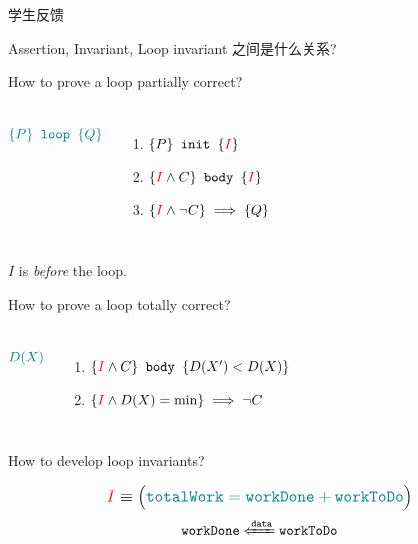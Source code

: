 
\begin{frame}{学生反馈}
  \centerline{\large {} Assertion, Invariant, Loop invariant 之间是什么关系?}
\end{frame}

\begin{frame}{}
  \centerline{\large {} How to prove a loop partially correct?}

  \begin{columns}
      \pause
      \[
	\textcolor{teal}{\{P\} \texttt{ loop } \{Q\}}
      \]
      \vspace{-0.20cm}
      \pause
      \begin{enumerate}[(1)]
	\setlength{\itemsep}{8pt}
	\item $\{P\} \texttt{ init } \{\textcolor{red}{I}\}$
	\item $\{\textcolor{red}{I} \land C\} \texttt{ body } \{\textcolor{red}{I}\}$
	\item $\{\textcolor{red}{I} \land \lnot C\} \implies \{Q\}$
      \end{enumerate}
  \end{columns}

  \pause
  \vspace{0.50cm}
  \centerline{$I$ is \emph{before} the loop.}
\end{frame}

\begin{frame}{}
  \centerline{\large {} How to prove a loop totally correct?}

  \begin{columns}
      \[
	\textcolor{teal}{D(X)}
      \]
      \vspace{-0.20cm}
      \pause
      \begin{enumerate}[(1)]
	\setlength{\itemsep}{8pt}
	\item $\{\textcolor{red}{I} \land C\} \texttt{ body } \{D(X') < D(X)\}$
	\item $\{\textcolor{red}{I} \land D(X) = \min\} \implies \lnot C$
      \end{enumerate}
  \end{columns}
\end{frame}

\begin{frame}{}
  \centerline{\large {} How to develop loop invariants?}

  \pause

  \pause
  \vspace{-0.30cm}
  \[
    \text{\large $\textcolor{red}{I} \equiv \big(\textcolor{teal}{\texttt{totalWork} = \texttt{workDone} + \texttt{workToDo}}\big)$}
  \]
  \pause
  \[
    \texttt{workDone} \xLeftarrow{\texttt{data}} \texttt{workToDo}
  \]
\end{frame}
